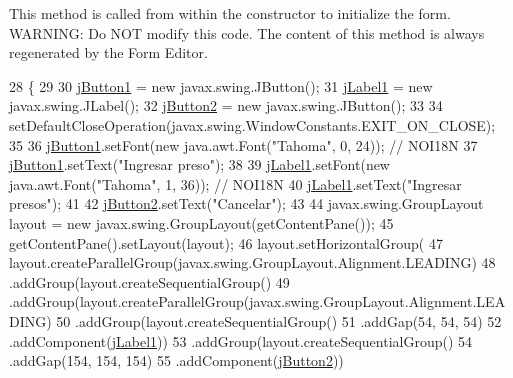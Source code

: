 This method is called from within the constructor to initialize the form. W\+A\+R\+N\+I\+NG\+: Do N\+OT modify this code. The content of this method is always regenerated by the Form Editor. 
\begin{DoxyCode}
28                                   \{
29 
30         \mbox{\hyperlink{classinterfacessoguar_1_1cu15_ae1acd607eefe095a62fbcf493003df08}{jButton1}} = \textcolor{keyword}{new} javax.swing.JButton();
31         \mbox{\hyperlink{classinterfacessoguar_1_1cu15_a783e8806159d278353a089058f4bbcc4}{jLabel1}} = \textcolor{keyword}{new} javax.swing.JLabel();
32         \mbox{\hyperlink{classinterfacessoguar_1_1cu15_a085521a7cfa254458af69b9b16239bc7}{jButton2}} = \textcolor{keyword}{new} javax.swing.JButton();
33 
34         setDefaultCloseOperation(javax.swing.WindowConstants.EXIT\_ON\_CLOSE);
35 
36         \mbox{\hyperlink{classinterfacessoguar_1_1cu15_ae1acd607eefe095a62fbcf493003df08}{jButton1}}.setFont(\textcolor{keyword}{new} java.awt.Font(\textcolor{stringliteral}{"Tahoma"}, 0, 24)); \textcolor{comment}{// NOI18N}
37         \mbox{\hyperlink{classinterfacessoguar_1_1cu15_ae1acd607eefe095a62fbcf493003df08}{jButton1}}.setText(\textcolor{stringliteral}{"Ingresar preso"});
38 
39         \mbox{\hyperlink{classinterfacessoguar_1_1cu15_a783e8806159d278353a089058f4bbcc4}{jLabel1}}.setFont(\textcolor{keyword}{new} java.awt.Font(\textcolor{stringliteral}{"Tahoma"}, 1, 36)); \textcolor{comment}{// NOI18N}
40         \mbox{\hyperlink{classinterfacessoguar_1_1cu15_a783e8806159d278353a089058f4bbcc4}{jLabel1}}.setText(\textcolor{stringliteral}{"Ingresar presos"});
41 
42         \mbox{\hyperlink{classinterfacessoguar_1_1cu15_a085521a7cfa254458af69b9b16239bc7}{jButton2}}.setText(\textcolor{stringliteral}{"Cancelar"});
43 
44         javax.swing.GroupLayout layout = \textcolor{keyword}{new} javax.swing.GroupLayout(getContentPane());
45         getContentPane().setLayout(layout);
46         layout.setHorizontalGroup(
47             layout.createParallelGroup(javax.swing.GroupLayout.Alignment.LEADING)
48             .addGroup(layout.createSequentialGroup()
49                 .addGroup(layout.createParallelGroup(javax.swing.GroupLayout.Alignment.LEADING)
50                     .addGroup(layout.createSequentialGroup()
51                         .addGap(54, 54, 54)
52                         .addComponent(\mbox{\hyperlink{classinterfacessoguar_1_1cu15_a783e8806159d278353a089058f4bbcc4}{jLabel1}}))
53                     .addGroup(layout.createSequentialGroup()
54                         .addGap(154, 154, 154)
55                         .addComponent(\mbox{\hyperlink{classinterfacessoguar_1_1cu15_a085521a7cfa254458af69b9b16239bc7}{jButton2}}))

\end{DoxyCode}

